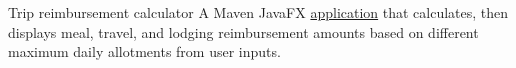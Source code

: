 \datedsubsection{}
{Trip reimbursement calculator}
{}
{A Maven JavaFX \href{https://github.com/jacobarchambault/travelexpenses}{application} that calculates, then displays meal, travel, and lodging reimbursement amounts based on different maximum daily allotments from user inputs.}
